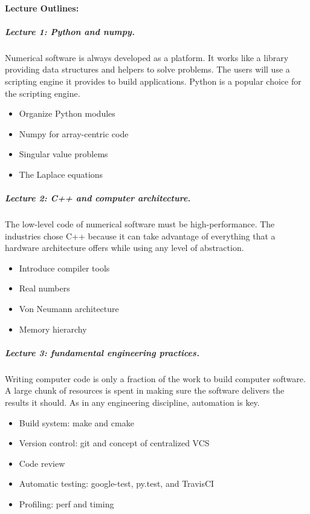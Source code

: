 \documentclass[11pt,a4paper]{article}
\begin{document}

\clearpage

\paragraph{Lecture Outlines:}

\subparagraph{Lecture 1: Python and numpy.}  Numerical software is always
developed as a platform.  It works like a library providing data structures and
helpers to solve problems.  The users will use a scripting engine it provides
to build applications.  Python is a popular choice for the scripting engine.

\begin{itemize}
\item Organize Python modules
\item Numpy for array-centric code
\item Singular value problems
\item The Laplace equations
\end{itemize}

\subparagraph{Lecture 2: C++ and computer architecture.}  The low-level code of
numerical software must be high-performance.  The industries chose C++ because
it can take advantage of everything that a hardware architecture offers while
using any level of abstraction.

\begin{itemize}
\item Introduce compiler tools
\item Real numbers
\item Von Neumann architecture
\item Memory hierarchy
\end{itemize}

\subparagraph{Lecture 3: fundamental engineering practices.}  Writing computer
code is only a fraction of the work to build computer software.  A large chunk
of resources is spent in making sure the software delivers the results it
should.  As in any engineering discipline, automation is key.

\begin{itemize}
\item Build system: make and cmake
\item Version control: git and concept of centralized VCS
\item Code review
\item Automatic testing: google-test, py.test, and TravisCI
\item Profiling: perf and timing
\end{itemize}
\end{document}
